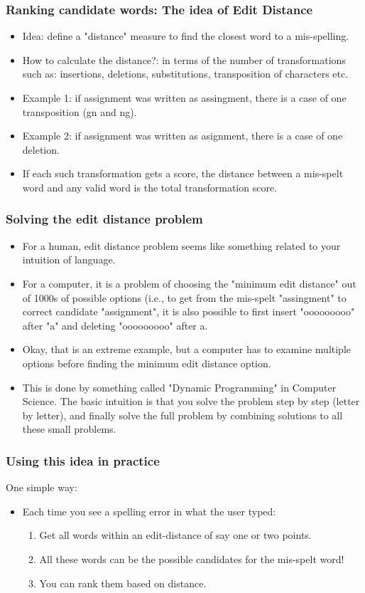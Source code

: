\documentclass{beamer}
\begin{document}
\begin{frame}
\frametitle{Ranking candidate words: The idea of Edit Distance}
\begin{itemize}
\item Idea: define a "distance" measure to find the closest word to a mis-spelling.
\item How to calculate the distance?: in terms of the number of transformations such as: insertions, deletions, substitutions, transposition of characters etc. \pause
\item Example 1: if assignment was written as assingment, there is a case of one transposition (gn and ng).
\item Example 2: if assignment was written as asignment, there is a case of one deletion. \pause
\item If each such transformation gets a score, the distance between a mis-spelt word and any valid word is the total transformation score.
\end{itemize}
\end{frame}

\begin{frame}
\frametitle{Solving the edit distance problem}
\begin{itemize}
\item For a human, edit distance problem seems like something related to your intuition of language.
\item For a computer, it is a problem of choosing the "minimum edit distance" out of 1000s of possible options (i.e., to get from the mis-spelt "assingment" to correct candidate "assignment", it is also possible to first insert "ooooooooo" after "a" and deleting "ooooooooo" after a. \pause
\item Okay, that is an extreme example, but a computer has to examine multiple options before finding the minimum edit distance option.
\item This is done by something called "Dynamic Programming" in Computer Science. The basic intuition is that you solve the problem step by step (letter by letter), and finally solve the full problem by combining solutions to all these small problems. 
\end{itemize}
\end{frame}

\begin{frame}
\frametitle{Using this idea in practice}
One simple way:
\begin{itemize}
\item Each time you see a spelling error in what the user typed:
\begin{enumerate}
\item Get all words within an edit-distance of say one or two points.
\item All these words can be the possible candidates for the mis-spelt word!
\item You can rank them based on distance. 
\end{enumerate}
\end{itemize}
\end{frame}
\end{document}
